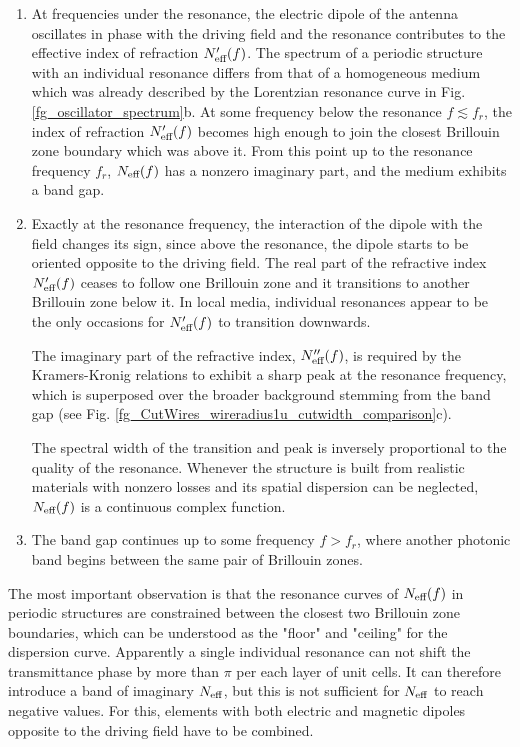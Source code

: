 \begin{enumerate}
\item{At frequencies under the resonance, the electric dipole of the antenna oscillates in phase with the driving field and the resonance contributes to the effective index of refraction $N_{\text{eff} }'(f)$. 
The spectrum of a periodic structure with an individual resonance differs from that of a homogeneous medium which was already described by the Lorentzian resonance curve in Fig. \ref{fg_oscillator_spectrum}b.
At some frequency below the resonance $f \lesssim f_r$, the index of refraction $N_{\text{eff} }'(f)$ becomes high enough to join the closest Brillouin zone boundary which was above it. From this point up to the resonance frequency $f_r$, $N_{\text{eff} }(f)$ has a nonzero imaginary part, and the medium exhibits a band gap.
} 
\item{Exactly at the resonance frequency, the interaction of the dipole with the field changes its sign, since above the resonance, the dipole starts to be oriented opposite to the driving field. 
The real part of the refractive index $N_{\text{eff} }'(f)$ ceases to follow one Brillouin zone and it transitions to another Brillouin zone below it. In local media, individual resonances appear to be the only occasions for $N_{\text{eff} }'(f)$ to transition downwards.

The imaginary part of the refractive index, $N_{\text{eff} }''(f)$, is required by the Kramers-Kronig relations to exhibit a sharp peak at the resonance frequency, which is superposed over the broader background stemming from the band gap (see Fig. \ref{fg_CutWires_wireradius1u_cutwidth_comparison}c). 

The spectral width of the transition and peak is inversely proportional to the quality of the resonance. Whenever the structure is built from realistic materials with nonzero losses and its spatial dispersion can be neglected, $N_{\text{eff} }(f)$ is a continuous complex function.
} 
\item{The band gap continues up to some frequency $f > f_r$, where another photonic band begins between the same pair of Brillouin zones.  
} 
\end{enumerate}

The most important observation is that the resonance curves of $N_{\text{eff} }(f)$ in periodic structures are constrained between the closest two Brillouin zone boundaries, which can be understood as the "floor" and "ceiling" for the dispersion curve. Apparently a single individual resonance can not shift the transmittance phase by more than $\pi$ per each layer of unit cells. It can therefore introduce a band of imaginary $N_{\text{eff} }$, but this is not sufficient for $N_{\text{eff} }$ to reach negative values. For this, elements with both electric and magnetic dipoles opposite to the driving field have to be combined.


